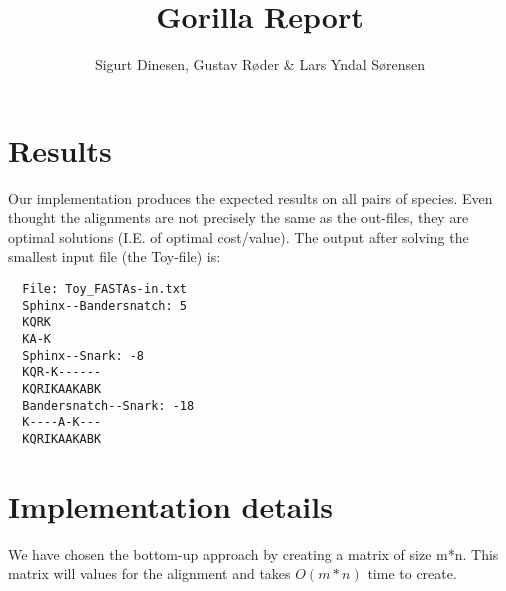 \documentclass{tufte-handout}
\title{Gorilla Report}
\author{Sigurt Dinesen, Gustav Røder \& Lars Yndal Sørensen}
\begin{document}
  \maketitle

  \section{Results}
	Our implementation produces the expected results on all pairs of
	species. Even thought the alignments are not precisely the same as the
	out-files, they are optimal solutions (I.E. of optimal cost/value).
	The output after solving the smallest input file (the Toy-file) is:

  \begin{fullwidth}\small
  	\begin{verbatim}
  File: Toy_FASTAs-in.txt
  Sphinx--Bandersnatch: 5
  KQRK
  KA-K
  Sphinx--Snark: -8
  KQR-K------
  KQRIKAAKABK
  Bandersnatch--Snark: -18
  K----A-K---
  KQRIKAAKABK
   \end{verbatim}
\end{fullwidth}


  \section{Implementation details}
	We have chosen the bottom-up approach by creating a matrix of size m*n. This matrix will values for the alignment and takes $O(m*n)$ time to create.
\end{document}

